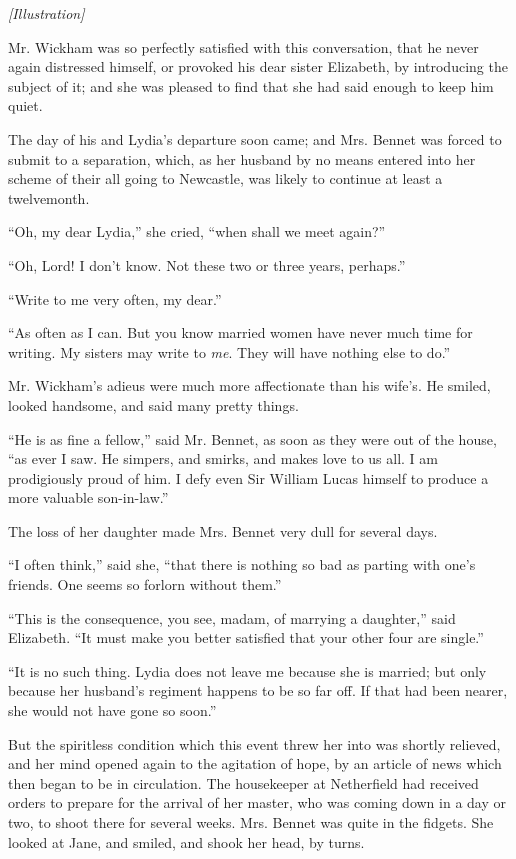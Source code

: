 \documentclass[12pt]{book}
\begin{document}
\emph{[Illustration]}

Mr. Wickham was so perfectly satisfied with this conversation, that he never again distressed himself, or provoked his dear sister Elizabeth, by introducing the subject of it; and she was pleased to find that she had said enough to keep him quiet.

The day of his and Lydia's departure soon came; and Mrs. Bennet was forced to submit to a separation, which, as her husband by no means entered into her scheme of their all going to Newcastle, was likely to continue at least a twelvemonth.

``Oh, my dear Lydia,'' she cried, ``when shall we meet again?''

``Oh, Lord! I don't know. Not these two or three years, perhaps.''

``Write to me very often, my dear.''

``As often as I can. But you know married women have never much time for writing. My sisters may write to \textit{me}. They will have nothing else to do.''

Mr. Wickham's adieus were much more affectionate than his wife's. He smiled, looked handsome, and said many pretty things.

``He is as fine a fellow,'' said Mr. Bennet, as soon as they were out of the house, ``as ever I saw. He simpers, and smirks, and makes love to us all. I am prodigiously proud of him. I defy even Sir William Lucas himself to produce a more valuable son-in-law.''

The loss of her daughter made Mrs. Bennet very dull for several days.

``I often think,'' said she, ``that there is nothing so bad as parting with one's friends. One seems so forlorn without them.''

``This is the consequence, you see, madam, of marrying a daughter,'' said Elizabeth. ``It must make you better satisfied that your other four are single.''

``It is no such thing. Lydia does not leave me because she is married; but only because her husband's regiment happens to be so far off. If that had been nearer, she would not have gone so soon.''

But the spiritless condition which this event threw her into was shortly relieved, and her mind opened again to the agitation of hope, by an article of news which then began to be in circulation. The housekeeper at Netherfield had received orders to prepare for the arrival of her master, who was coming down in a day or two, to shoot there for several weeks. Mrs. Bennet was quite in the fidgets. She looked at Jane, and smiled, and shook her head, by turns.
\end{document}

